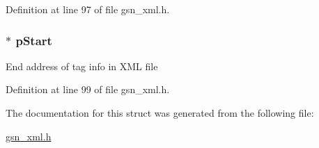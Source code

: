 Definition at line 97 of file gsn\_\-xml.h.

\hypertarget{a00434_a2a5c3e1de1bdf3a69f40712b55858f10}{
\subsubsection[{pStart}]{$\ast$ {\bf pStart}}}
\label{a00434_a2a5c3e1de1bdf3a69f40712b55858f10}
End address of tag info in XML file 

Definition at line 99 of file gsn\_\-xml.h.



The documentation for this struct was generated from the following file:\begin{DoxyCompactItemize}
\item 
\hyperlink{a00616}{gsn\_\-xml.h}\end{DoxyCompactItemize}
